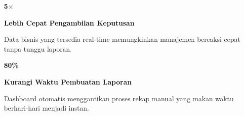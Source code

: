 \documentclass[a4paper]{article}
\begin{document}
\noindent
\begin{minipage}[t]{0.485\textwidth}
    \noindent\colorbox{BlueBg}{%
        \begin{minipage}[t]{\dimexpr\linewidth-2\fboxsep}
            \vspace{6pt}
            {\fontsize{20}{24}\selectfont\bfseries\color{IndigoPrimary} 5$\times$}\par\vspace{2pt}
            {\fontsize{9.5}{12}\selectfont\bfseries\color{BlueDark} Lebih Cepat Pengambilan Keputusan}\par\vspace{2pt}
            {\fontsize{8.5}{11}\selectfont\color{TextDark}Data bisnis yang tersedia real-time memungkinkan manajemen bereaksi cepat tanpa tunggu laporan.}%
            \vspace{6pt}
        \end{minipage}}%
    \vspace{6pt}
    \noindent\colorbox{BlueBg}{%
        \begin{minipage}[t]{\dimexpr\linewidth-2\fboxsep}
            \vspace{6pt}
            {\fontsize{20}{24}\selectfont\bfseries\color{IndigoPrimary} 80\%}\par\vspace{2pt}
            {\fontsize{9.5}{12}\selectfont\bfseries\color{BlueDark} Kurangi Waktu Pembuatan Laporan}\par\vspace{2pt}
            {\fontsize{8.5}{11}\selectfont\color{TextDark}Dashboard otomatis menggantikan proses rekap manual yang makan waktu berhari-hari menjadi instan.}%
            \vspace{6pt}
        \end{minipage}}%
\end{minipage}%
\hfill
\end{document}
